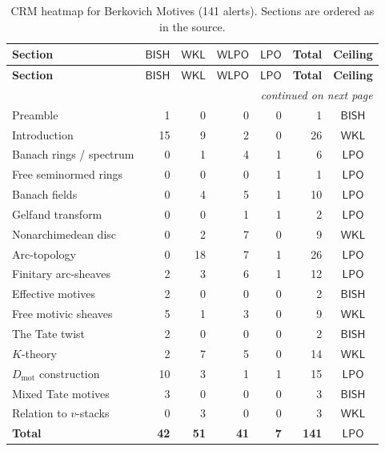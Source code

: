 \documentclass[11pt,a4paper]{article}
\theoremstyle{plain}
\theoremstyle{definition}
\newcommand{\BISH}{\textsf{BISH}}
\newcommand{\WKL}{\textsf{WKL}}
\newcommand{\WLPO}{\textsf{WLPO}}
\newcommand{\LPO}{\textsf{LPO}}
\newcommand{\Dmot}{D_{\mathrm{mot}}}
\begin{document}
{\small
\begin{longtable}{@{}p{4.0cm}rrrrrc@{}}
\caption{CRM heatmap for Berkovich Motives (141 alerts).  Sections are ordered as in the source.}
\label{tab:berkovich-heatmap} \\
\toprule
\textbf{Section} & \textbf{$\BISH$} & \textbf{$\WKL$} & \textbf{$\WLPO$} & \textbf{$\LPO$} & \textbf{Total} & \textbf{Ceiling} \\
\midrule
\endfirsthead
\toprule
\textbf{Section} & \textbf{$\BISH$} & \textbf{$\WKL$} & \textbf{$\WLPO$} & \textbf{$\LPO$} & \textbf{Total} & \textbf{Ceiling} \\
\midrule
\endhead
\midrule
\multicolumn{7}{r}{\emph{continued on next page}} \\
\endfoot
\bottomrule
\endlastfoot
%
Preamble                & 1 &  0 &  0 & 0 &  1 & $\BISH$ \\
Introduction            &15 &  9 &  2 & 0 & 26 & $\WKL$  \\
Banach rings / spectrum &  0 &  1 &  4 & 1 &  6 & $\LPO$  \\
Free seminormed rings   &  0 &  0 &  0 & 1 &  1 & $\LPO$  \\
Banach fields           &  0 &  4 &  5 & 1 & 10 & $\LPO$  \\
Gelfand transform       &  0 &  0 &  1 & 1 &  2 & $\LPO$  \\
Nonarchimedean disc     &  0 &  2 &  7 & 0 &  9 & $\WKL$  \\
Arc-topology            &  0 & 18 &  7 & 1 & 26 & $\LPO$  \\
Finitary arc-sheaves    &  2 &  3 &  6 & 1 & 12 & $\LPO$  \\
Effective motives       &  2 &  0 &  0 & 0 &  2 & $\BISH$ \\
Free motivic sheaves    &  5 &  1 &  3 & 0 &  9 & $\WKL$  \\
The Tate twist          &  2 &  0 &  0 & 0 &  2 & $\BISH$ \\
$K$-theory              &  2 &  7 &  5 & 0 & 14 & $\WKL$  \\
$\Dmot$ construction    & 10 &  3 &  1 & 1 & 15 & $\LPO$  \\
Mixed Tate motives      &  3 &  0 &  0 & 0 &  3 & $\BISH$ \\
Relation to $v$-stacks  &  0 &  3 &  0 & 0 &  3 & $\WKL$  \\
\midrule
\textbf{Total}          & \textbf{42} & \textbf{51} & \textbf{41} & \textbf{7} & \textbf{141} & $\LPO$ \\
\end{longtable}
}
\end{document}
